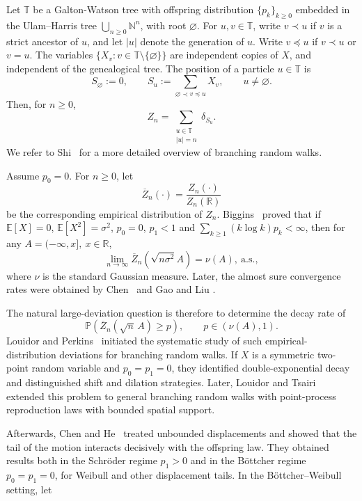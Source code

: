 \documentclass[a4paper, 11pt]{article}
\newcommand{\1}{\mathbf 1}
\theoremstyle{plain}
\begin{document}
Let \(\mathbb T\) be a
Galton-Watson tree with offspring distribution
\(\{p_k\}_{k\geq0}\) embedded in the Ulam--Harris tree
\(\bigcup_{n\geq0}{\mathbb{N}}^n\), with root \(\varnothing\). For \(u,v\in\mathbb T\), write \(v\prec u\) if
\(v\) is a strict ancestor of \(u\), and let \(|u|\) denote the generation
of \(u\).  Write \(v\preceq u\) if \(v\prec u\) or $v=u$. The variables \(\{X_v:v\in\mathbb T\setminus
\{\varnothing\}\}\) are independent copies of \(X\), and independent of the
genealogical tree. The position of a particle \(u\in\mathbb T\) is
\[
  S_\varnothing:=0,
  \qquad
  S_u:=\sum_{\varnothing\prec v\preceq u}X_v,
  \qquad u\neq\varnothing.
\]
Then, for $n\geq0$,
\[
  Z_n=\sum_{\substack{u\in\mathbb T\\|u|=n}}\delta_{S_u}.
\]
We refer to
Shi~\cite{Shi2015} for a more detailed overview of branching random walks.
\par
Assume $p_0=0$. For $n\geq0$, let
$$\overline Z_n(\cdot)=\frac{Z_n(\cdot)}{Z_n(\mathbb{R})}$$
be the corresponding empirical distribution of $Z_n$.
Biggins~\cite{Biggins1990} proved that if \(\mathbb{E}[X]=0\), \(\mathbb{E}[X^2]=\sigma^2\), $p_0=0$, $p_1<1$ and $\sum_{k\geq1}(k\log k)p_k<\infty$, then for any $A=(-\infty,x],~x\in\mathbb{R}$,
$$
\lim_{n\to\infty}\overline Z_n(\sqrt {n\sigma^2}A)=\nu(A),~\text{a.s.},
$$
where $\nu$ is the standard Gaussian measure. Later, the almost sure convergence rates were obtained by Chen~\cite{Chen2001} and Gao and Liu \cite{GaoLiu2016}.
\par
The natural large-deviation question is therefore to determine the decay rate of
\[
  \mathbb{P}\!\left(\overline Z_n(\sqrt n\,A)\geq p\right),
  \qquad p\in(\nu(A),1).
  \label{eq:intro-event}
\]
Louidor and Perkins~\cite{LouidorPerkins2015} initiated the systematic study
of such empirical-distribution deviations for branching random walks.  If
$X$ is a symmetric two-point random variable and $p_0=p_1=0$, they identified double-exponential decay and distinguished shift
and dilation strategies.  Later, Louidor and Tsairi~\cite{LouidorTsairi2017}
extended this problem to general branching random walks with point-process reproduction laws with bounded spatial support.
\par
Afterwards, Chen and He~\cite{ChenHe2019} treated unbounded displacements and showed that
the tail of the motion interacts decisively with the offspring law. They
obtained results both in the Schr\"oder regime \(p_1>0\) and in the
B\"ottcher regime \(p_0=p_1=0\), for Weibull and other displacement tails. In the B\"ottcher--Weibull setting, let
\end{document}
